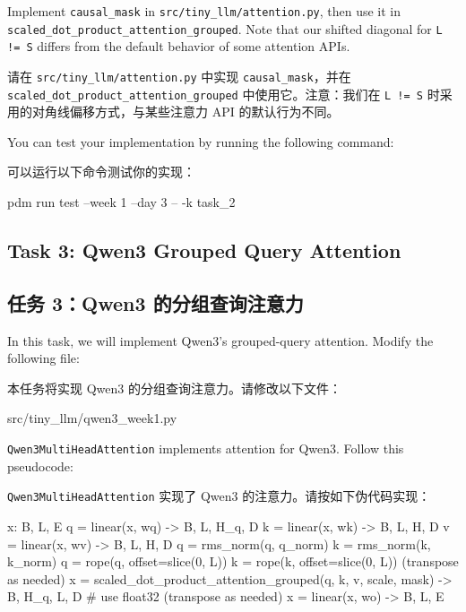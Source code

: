 \documentclass[11pt,a4paper]{article}
\newenvironment{zhpar}{%
  \par\smallskip\begingroup\color{zhcolor}\small\ignorespaces%
}{\endgroup\par\smallskip}
\begin{document}
Implement \texttt{causal\_mask} in \texttt{src/tiny\_llm/attention.py}, then use it in \texttt{scaled\_dot\_product\_attention\_grouped}. Note that our shifted diagonal for \texttt{L != S} differs from the default behavior of some attention APIs.

\begin{zhpar}
请在 \texttt{src/tiny\_llm/attention.py} 中实现 \texttt{causal\_mask}，并在 \texttt{scaled\_dot\_product\_attention\_grouped} 中使用它。注意：我们在 \texttt{L != S} 时采用的对角线偏移方式，与某些注意力 API 的默认行为不同。
\end{zhpar}
You can test your implementation by running the following command:

\begin{zhpar}
可以运行以下命令测试你的实现：
\end{zhpar}
\begin{codeblock}
pdm run test --week 1 --day 3 -- -k task_2
\end{codeblock}

\subsection*{Task 3: Qwen3 Grouped Query Attention}

\subsection*{任务 3：Qwen3 的分组查询注意力}

In this task, we will implement Qwen3's grouped-query attention. Modify the following file:

\begin{zhpar}
本任务将实现 Qwen3 的分组查询注意力。请修改以下文件：
\end{zhpar}
\begin{codeblock}
src/tiny_llm/qwen3_week1.py
\end{codeblock}

\texttt{Qwen3MultiHeadAttention} implements attention for Qwen3. Follow this pseudocode:

\begin{zhpar}
\texttt{Qwen3MultiHeadAttention} 实现了 Qwen3 的注意力。请按如下伪代码实现：
\end{zhpar}
\begin{codeblock}
x: B, L, E
q = linear(x, wq) -> B, L, H_q, D
k = linear(x, wk) -> B, L, H, D
v = linear(x, wv) -> B, L, H, D
q = rms_norm(q, q_norm)
k = rms_norm(k, k_norm)
q = rope(q, offset=slice(0, L))
k = rope(k, offset=slice(0, L))
(transpose as needed)
x = scaled_dot_product_attention_grouped(q, k, v, scale, mask) -> B, H_q, L, D  # use float32
(transpose as needed)
x = linear(x, wo) -> B, L, E
\end{codeblock}
\end{document}
